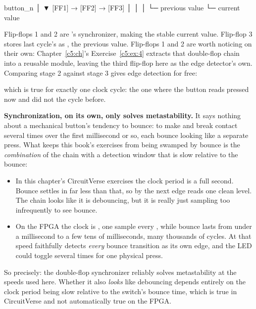 \begin{textdrawing}
button_n
   │
   ▼
[FF1] → [FF2] → [FF3]
        │        │
        │        └─ previous value
        └─ current value
\end{textdrawing}

\noindent Flip-flops 1 and 2 are 's synchronizer, making  the stable
current value. Flip-flop 3 stores last cycle's  as , the
previous value. Flip-flops 1 and 2 are worth noticing on their own: Chapter~\ref{c5:ch}'s
Exercise~\ref{c5:ex:4} extracts that double-flop chain into a reusable  module, leaving
the third flip-flop here as the edge detector's own. Comparing stage 2 against stage 3 gives edge
detection for free:

\begin{center}
\end{center}

\noindent which is true for exactly one clock cycle: the one where the button reads pressed now and
did not the cycle before.

\textbf{Synchronization, on its own, only solves metastability.} It says nothing about a mechanical
button's tendency to bounce: to make and break contact several times over the first millisecond or
so, each bounce looking like a separate press. What keeps this book's exercises from being swamped
by bounce is the \emph{combination} of the chain with a detection window that is slow relative to
the bounce:
\begin{itemize}
  \item In this chapter's CircuitVerse exercises the clock period is a full second. Bounce settles
    in far less than that, so by the next edge  reads one clean level. The chain
    looks like it is debouncing, but it is really just sampling too infrequently to see bounce.
  \item On the FPGA the clock is , one sample every , while bounce lasts
    from under a millisecond to a few tens of milliseconds, many thousands of cycles. At that speed
     faithfully detects \emph{every} bounce transition as its own edge, and the LED
    could toggle several times for one physical press.
\end{itemize}
So precisely: the double-flop synchronizer reliably solves metastability at the speeds used here.
Whether it also \emph{looks} like debouncing depends entirely on the clock period being slow
relative to the switch's bounce time, which is true in CircuitVerse and not automatically true on
the FPGA.


